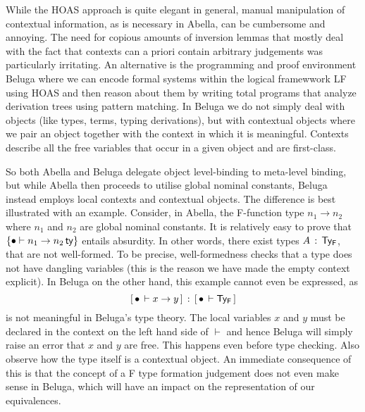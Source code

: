 \newcommand{\tax}{\textsf{t\_ax}}
\newcommand{\tpi}{\textsf{t\_pi}~}
\newcommand{\tlam}{\textsf{t\_lam}~}
\newcommand{\tapp}{\textsf{t\_app}~}
\newcommand{\ptc}{\textsf{p\_tc}}

\newcommand{\rall}{\textsf{r\_all}}
\newcommand{\rarr}{\textsf{r\_arr}}
\newcommand{\rapp}{\textsf{r\_app}}
\newcommand{\rtapp}{\textsf{r\_App}}
\newcommand{\rlam}{\textsf{r\_lam}}
\newcommand{\rtlam}{\textsf{r\_Lam}}

\newcommand{\D}{\mathcal{D}}

While the HOAS approach is quite elegant in general,  manual manipulation of contextual information, as is necessary in Abella, can be cumbersome and annoying.
The need for copious amounts of inversion lemmas that mostly deal with the fact that contexts can a priori contain arbitrary judgements was particularly irritating.
An alternative is the programming and proof environment Beluga \cite{Pientka:IJCAR10,Pientka:FLOPS10,Pientka:CADE15} where we can encode formal systems within the logical framewwork LF \cite{Harper93jacm} using HOAS and then reason about them by writing total programs that analyze derivation trees using pattern matching.
In Beluga we do not simply deal with objects (like types, terms, typing derivations), but with contextual objects where we pair an object together with the context in which it is meaningful\cite{Nanevski:ICML05,Pientka:POPL08}.
Contexts describe all the free variables that occur in a given object and are first-class.

So both Abella and Beluga delegate object level-binding to meta-level binding, but while Abella then proceeds to utilise global nominal constants, Beluga instead employs local contexts and contextual objects.
The difference is best illustrated with an example.
Consider, in Abella, the F-function type $n_1 \to n_2$ where $n_1$ and $n_2$ are global nominal constants.
It is relatively easy to prove that $\{\bullet \vdash n_1 \to n_2\,\mathsf{ty}\}$ entails absurdity.
In other words, there exist types $A \mathrel{\, : \,} \mathsf{Ty_{F}}$, that are not well-formed.
To be precise, well-formedness checks that a type does not have dangling variables (this is the reason we have made the empty context explicit).
%
\newcommand{\bc}[2]{\ensuremath{[\,#1\,\vdash #2\,]}}
In Beluga on the other hand, this example cannot even be expressed, as \[\bc{\emptyctx}{x \to y} \OF \bc{\emptyctx}{\TyF}\] is not meaningful in Beluga's type theory. The local variables $x$ and $y$ must be declared in the context on the left hand side of $\vdash$ and hence Beluga will simply raise an error that $x$ and $y$ are free. This happens even before type checking. Also observe how the type itself is a contextual object. An immediate consequence of this is that the concept of a F type formation judgement does not even make sense in Beluga, which will have an impact on the representation of our equivalences.

